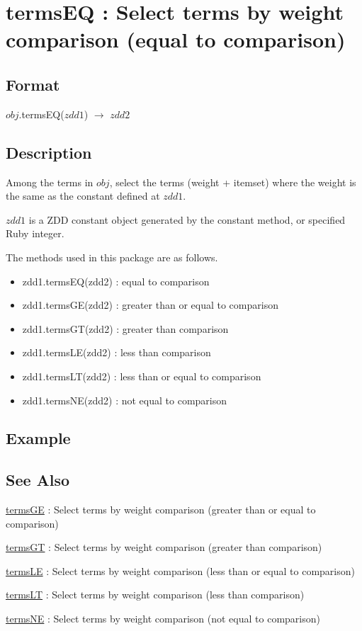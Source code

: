 
\section{termsEQ : Select terms by weight comparison (equal to comparison)\label{sect:termsEQ}}
\subsection*{Format}
$obj$.termsEQ($zdd1$) $\rightarrow$ $zdd2$

\subsection*{Description}
Among the terms in $obj$, select the terms (weight + itemset) where the weight is the same as the constant defined at $zdd1$.

$zdd1$ is a ZDD constant object generated by the constant method, or specified Ruby integer.  

The methods used in this package are as follows. 
\begin{itemize}
\item zdd1.termsEQ(zdd2) : equal to comparison
\item zdd1.termsGE(zdd2) : greater than or equal to comparison
\item zdd1.termsGT(zdd2) : greater than comparison
\item zdd1.termsLE(zdd2) : less than comparison
\item zdd1.termsLT(zdd2) : less than or equal to comparison
\item zdd1.termsNE(zdd2) : not equal to comparison
\end{itemize}


\subsection*{Example}


\subsection*{See Also}
\hyperref[sect:termsGE]{termsGE} : Select terms by weight comparison (greater than  or equal to comparison)

\hyperref[sect:termsGT]{termsGT} : Select terms by weight comparison (greater than  comparison)

\hyperref[sect:termsLE]{termsLE} : Select terms by weight comparison (less than or equal to comparison)

\hyperref[sect:termsLT]{termsLT} : Select terms by weight comparison (less than comparison)

\hyperref[sect:termsNE]{termsNE} : Select terms by weight comparison (not equal to comparison)


